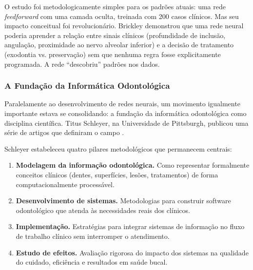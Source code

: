 O estudo foi metodologicamente simples para os padrões atuais: uma rede \textit{feedforward} com uma camada oculta, treinada com 200 casos clínicos. Mas seu impacto conceitual foi revolucionário. Brickley demonstrou que uma rede neural poderia aprender a relação entre sinais clínicos (profundidade de inclusão, angulação, proximidade ao nervo alveolar inferior) e a decisão de tratamento (exodontia vs. preservação) sem que nenhuma regra fosse explicitamente programada. A rede ``descobriu'' padrões nos dados.

\subsubsection{A Fundação da Informática Odontológica}

Paralelamente ao desenvolvimento de redes neurais, um movimento igualmente importante estava se consolidando: a fundação da informática odontológica como disciplina científica. Titus Schleyer, na Universidade de Pittsburgh, publicou uma série de artigos que definiram o campo \cite{ODT-004, ODT-007}.


Schleyer \cite{ODT-007, ODT-004, ODT-006} estabeleceu quatro pilares metodológicos que permanecem centrais:

\begin{enumerate}
    \item \textbf{Modelagem da informação odontológica.} Como representar formalmente conceitos clínicos (dentes, superfícies, lesões, tratamentos) de forma computacionalmente processável.
    \item \textbf{Desenvolvimento de sistemas.} Metodologias para construir software odontológico que atenda às necessidades reais dos clínicos.
    \item \textbf{Implementação.} Estratégias para integrar sistemas de informação no fluxo de trabalho clínico sem interromper o atendimento.
    \item \textbf{Estudo de efeitos.} Avaliação rigorosa do impacto dos sistemas na qualidade do cuidado, eficiência e resultados em saúde bucal.
\end{enumerate}

